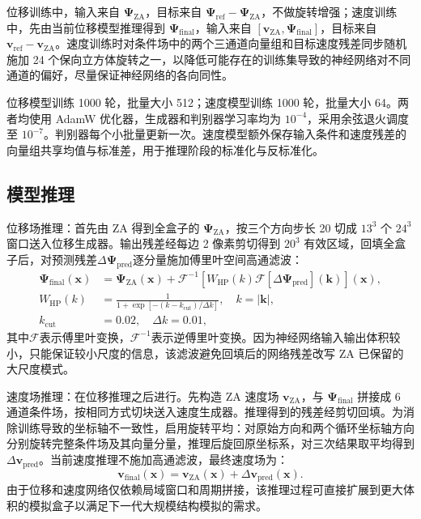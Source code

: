 位移训练中，输入来自 $\boldsymbol{\Psi}_{\mathrm{ZA}}$，目标来自 $\boldsymbol{\Psi}_{\mathrm{ref}}-\boldsymbol{\Psi}_{\mathrm{ZA}}$，不做旋转增强；速度训练中，先由当前位移模型推理得到 $\boldsymbol{\Psi}_{\mathrm{final}}$，输入来自 $[\boldsymbol{v}_{\mathrm{ZA}},\boldsymbol{\Psi}_{\mathrm{final}}]$，目标来自 $\boldsymbol{v}_{\mathrm{ref}}-\boldsymbol{v}_{\mathrm{ZA}}$。速度训练时对条件场中的两个三通道向量组和目标速度残差同步随机施加 24 个保向立方体旋转之一，以降低可能存在的训练集导致的神经网络对不同通道的偏好，尽量保证神经网络的各向同性。

位移模型训练 1000 轮，批量大小 512；速度模型训练 1000 轮，批量大小 64。两者均使用 AdamW 优化器，生成器和判别器学习率均为 $10^{-4}$，采用余弦退火调度至 $10^{-7}$。判别器每个小批量更新一次。速度模型额外保存输入条件和速度残差的向量组共享均值与标准差，用于推理阶段的标准化与反标准化。

\subsection{模型推理}

位移场推理：首先由 ZA 得到全盒子的 $\boldsymbol{\Psi}_{\mathrm{ZA}}$，按三个方向步长 20 切成 $13^3$ 个 $24^3$ 窗口送入位移生成器。输出残差经每边 2 像素剪切得到 $20^3$ 有效区域，回填全盒子后，对预测残差$\Delta\boldsymbol{\Psi}_{\mathrm{pred}}$逐分量施加傅里叶空间高通滤波：
\begin{equation}
  \begin{aligned}
    \boldsymbol{\Psi}_{\mathrm{final}}(\boldsymbol{x}) & = \boldsymbol{\Psi}_{\mathrm{ZA}}(\boldsymbol{x}) + \mathcal{F}^{-1}\left[ W_{\mathrm{HP}}(k) \mathcal{F}\left[\Delta\boldsymbol{\Psi}_{\mathrm{pred}}\right](\boldsymbol{k}) \right](\boldsymbol{x}), \\
    W_{\mathrm{HP}}(k)                                 & = \frac{1}{1+\exp\left[-(k-k_{\mathrm{cut}})/\Delta k\right]}, \quad k=|\boldsymbol{k}|,                                                                                                               \\
    k_{\mathrm{cut}}                                   & = 0.02, \quad \Delta k = 0.01,
  \end{aligned}
\end{equation}
其中$\mathcal{F}$表示傅里叶变换，$\mathcal{F}^{-1}$表示逆傅里叶变换。因为神经网络输入输出体积较小，只能保证较小尺度的信息，该滤波避免回填后的网络残差改写 ZA 已保留的大尺度模式。

速度场推理：在位移推理之后进行。先构造 ZA 速度场 $\boldsymbol{v}_{\mathrm{ZA}}$，与 $\boldsymbol{\Psi}_{\mathrm{final}}$ 拼接成 6 通道条件场，按相同方式切块送入速度生成器。推理得到的残差经剪切回填。为消除训练导致的坐标轴不一致性，启用旋转平均：对原始方向和两个循环坐标轴方向分别旋转完整条件场及其向量分量，推理后旋回原坐标系，对三次结果取平均得到 $\Delta\boldsymbol{v}_{\mathrm{pred}}$。当前速度推理不施加高通滤波，最终速度场为：
\begin{equation}
  \boldsymbol{v}_{\mathrm{final}}(\boldsymbol{x}) = \boldsymbol{v}_{\mathrm{ZA}}(\boldsymbol{x}) + \Delta\boldsymbol{v}_{\mathrm{pred}}(\boldsymbol{x}).
\end{equation}
由于位移和速度网络仅依赖局域窗口和周期拼接，该推理过程可直接扩展到更大体积的模拟盒子以满足下一代大规模结构模拟的需求。
